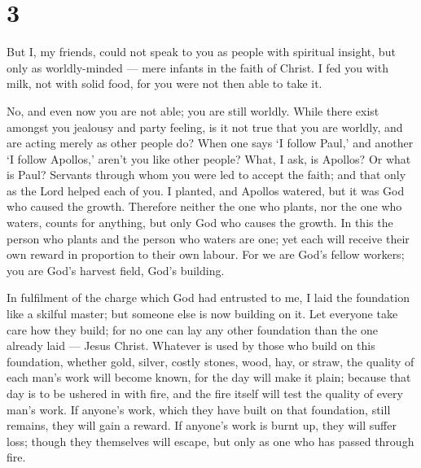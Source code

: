 \hypertarget{section-2}{%
\section{3}\label{section-2}}

 But I, my friends, could not speak to you as people with
spiritual insight, but only as worldly-minded --- mere infants in the
faith of Christ.  I fed you with milk, not with solid food,
for you were not then able to take it.

No, and even now you are not able; you are still worldly. 
While there exist amongst you jealousy and party feeling, is it not true
that you are worldly, and are acting merely as other people do?
 When one says `I follow Paul,' and another `I follow
Apollos,' aren't you like other people?  What, I ask, is
Apollos? Or what is Paul? Servants through whom you were led to accept
the faith; and that only as the Lord helped each of you.  I
planted, and Apollos watered, but it was God who caused the growth.
 Therefore neither the one who plants, nor the one who
waters, counts for anything, but only God who causes the growth.
 In this the person who plants and the person who waters are
one; yet each will receive their own reward in proportion to their own
labour.  For we are God's fellow workers; you are God's
harvest field, God's building.

 In fulfilment of the charge which God had entrusted to me,
I laid the foundation like a skilful master; but someone else is now
building on it. Let everyone take care how they build;  for
no one can lay any other foundation than the one already laid --- Jesus
Christ.  Whatever is used by those who build on this
foundation, whether gold, silver, costly stones, wood, hay, or straw,
 the quality of each man's work will become known, for the
day will make it plain; because that day is to be ushered in with fire,
and the fire itself will test the quality of every man's work.
 If anyone's work, which they have built on that
foundation, still remains, they will gain a reward.  If
anyone's work is burnt up, they will suffer loss; though they themselves
will escape, but only as one who has passed through fire.

